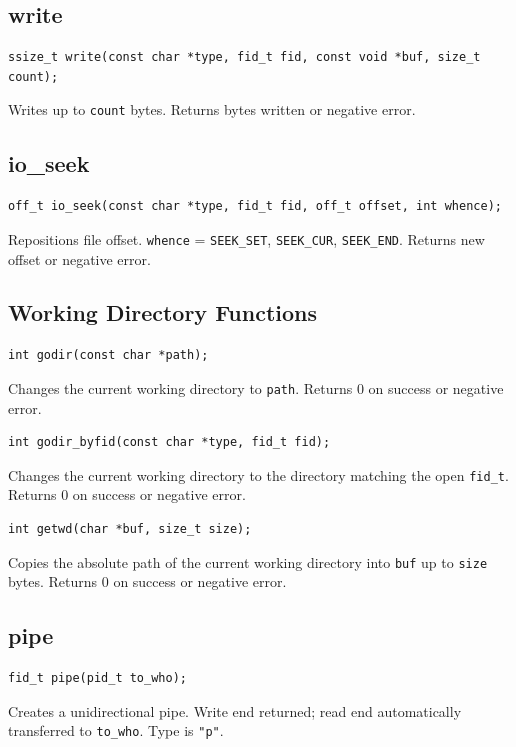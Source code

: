 \documentclass[12pt,a4paper]{article}
\begin{document}
\subsection{write}
\begin{lstlisting}
ssize_t write(const char *type, fid_t fid, const void *buf, size_t count);
\end{lstlisting}
Writes up to \texttt{count} bytes. Returns bytes written or negative error.

\subsection{io\_seek}
\begin{lstlisting}
off_t io_seek(const char *type, fid_t fid, off_t offset, int whence);
\end{lstlisting}
Repositions file offset. \texttt{whence} = \texttt{SEEK\_SET}, \texttt{SEEK\_CUR}, \texttt{SEEK\_END}. Returns new offset or negative error.

\subsection{Working Directory Functions}

\begin{verbatim}
int godir(const char *path);
\end{verbatim}
Changes the current working directory to \texttt{path}. Returns 0 on success or negative error.

\begin{verbatim}
int godir_byfid(const char *type, fid_t fid);
\end{verbatim}
Changes the current working directory to the directory matching the open \texttt{fid\_t}. Returns 0 on success or negative error.

\begin{verbatim}
int getwd(char *buf, size_t size);
\end{verbatim}
Copies the absolute path of the current working directory into \texttt{buf} up to \texttt{size} bytes. Returns 0 on success or negative error.

\subsection{pipe}
\begin{lstlisting}
fid_t pipe(pid_t to_who);
\end{lstlisting}
Creates a unidirectional pipe. Write end returned; read end automatically transferred to \texttt{to\_who}. Type is \texttt{"p"}.
\end{document}
